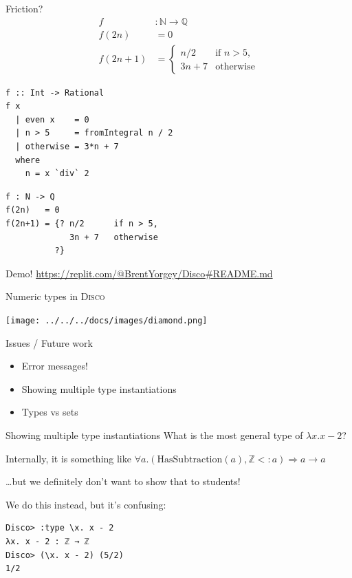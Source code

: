 \documentclass[fleqn,xcolor={usenames,dvipsnames,svgnames,table},12pt,aspectratio=169]{beamer}
\newenvironment{xframe}[1][]
  {\begin{frame}[fragile,environment=xframe,#1]}
  {\end{frame}}
\newcommand{\disco}{\textsc{Disco}\xspace}
\newcommand{\N}{\mathbb{N}}
\newcommand{\Z}{\mathbb{Z}}
\newcommand{\Q}{\mathbb{Q}}
\begin{document}
\begin{xframe}{Friction?}
  \begin{align*}
    f &: \N \to \Q \\
    f(2n)   &= 0 \\
    f(2n+1) &= \begin{cases} n/2 & \text{if } n > 5, \\
      3n + 7 & \text{otherwise}
      \end{cases}
  \end{align*}

  \begin{overprint}

    \begin{center}
  \begin{verbatim}
f :: Int -> Rational
f x
  | even x    = 0
  | n > 5     = fromIntegral n / 2
  | otherwise = 3*n + 7
  where
    n = x `div` 2
  \end{verbatim}
    \end{center}

  \begin{verbatim}
f : N -> Q
f(2n)   = 0
f(2n+1) = {? n/2      if n > 5,
             3n + 7   otherwise
          ?}
  \end{verbatim}
  \end{overprint}
\end{xframe}

\begin{xframe}{Demo!}
  \url{https://replit.com/@BrentYorgey/Disco#README.md}
\end{xframe}

\begin{xframe}{Numeric types in \disco}
  \begin{center}
    \texttt{[image: ../../../docs/images/diamond.png]}
  \end{center}
\end{xframe}

\begin{xframe}{Issues / Future work}
  \begin{itemize}
  \item Error messages!
  \item Showing multiple type instantiations
  \item Types vs sets
  \end{itemize}
\end{xframe}

\begin{xframe}{Showing multiple type instantiations}
  What is the most general type of $\lambda x. x - 2$?
  \bigskip

   Internally, it is something like $\forall
  a. (\mathrm{HasSubtraction}(a), \Z <: a) \Rightarrow a \to a$
  \bigskip

   \dots but we definitely don't want to show that to
  students! \bigskip

   We do this instead, but it's confusing:
  \begin{verbatim}
Disco> :type \x. x - 2
λx. x - 2 : ℤ → ℤ
Disco> (\x. x - 2) (5/2)
1/2
  \end{verbatim}
\end{xframe}
\end{document}
